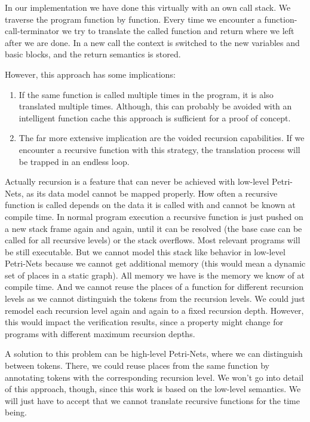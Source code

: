 In our implementation we have done this virtually with an own call stack.
We traverse the program function by function.
Every time we encounter a function-call-terminator we try to translate the called function and return where we left after we are done.
In a new call the context is switched to the new variables and basic blocks, and the return semantics is stored.

However, this approach has some implications:
\begin{enumerate}
    \item If the same function is called multiple times in the program, it is also translated multiple times.
    Although, this can probably be avoided with an intelligent function cache this approach is sufficient for a proof of concept.
    \item The far more extensive implication are the voided recursion capabilities.
    If we encounter a recursive function with this strategy, the translation process will be trapped in an endless loop.
\end{enumerate}
Actually recursion is a feature that can never be achieved with low-level Petri-Nets, as its data model cannot be mapped properly.
How often a recursive function is called depends on the data it is called with and cannot be known at compile time.
In normal program execution a recursive function is just pushed on a new stack frame again and again, until it can be resolved (the base case can be called for all recursive levels) or the stack overflows.
Most relevant programs will be still executable.
But we cannot model this stack like behavior in low-level Petri-Nets because we cannot get additional memory (this would mean a dynamic set of places in a static graph).
All memory we have is the memory we know of at compile time.
And we cannot reuse the places of a function for different recursion levels as we cannot distinguish the tokens from the recursion levels.
We could just remodel each recursion level again and again to a fixed recursion depth.
However, this would impact the verification results, since a property might change for programs with different maximum recursion depths.

A solution to this problem can be high-level Petri-Nets, where we can distinguish between tokens.
There, we could reuse places from the same function by annotating tokens with the corresponding recursion level.
We won't go into detail of this approach, though, since this work is based on the low-level semantics.
We will just have to accept that we cannot translate recursive functions for the time being.

